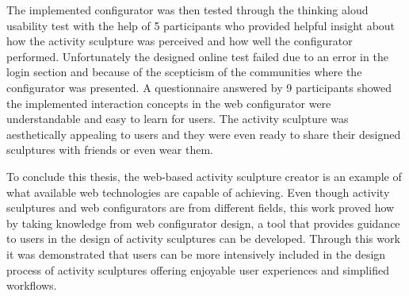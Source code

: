 \documentclass[../medieninformatik-arbeit.tex]{subfiles}
\begin{document}
The implemented configurator was then tested through the thinking aloud usability test with the help of 5 participants who provided helpful insight about how the activity sculpture was perceived and how well the configurator performed. Unfortunately the designed online test failed due to an error in the login section and because of the scepticism of the communities where the configurator was presented. A questionnaire answered by 9 participants showed the implemented interaction concepts in the web configurator were understandable and easy to learn for users. The activity sculpture was aesthetically appealing to users and they were even ready to share their designed sculptures with friends or even wear them. 

To conclude this thesis, the web-based activity sculpture creator is an example of what available web technologies are capable of achieving. Even though activity sculptures and web configurators are from different fields, this work proved how by taking knowledge from web configurator design, a tool that provides guidance to users in the design of activity sculptures can be developed. Through this work it was demonstrated that users can be more intensively included in the design process of activity sculptures offering enjoyable user experiences and simplified workflows.
\end{document}

